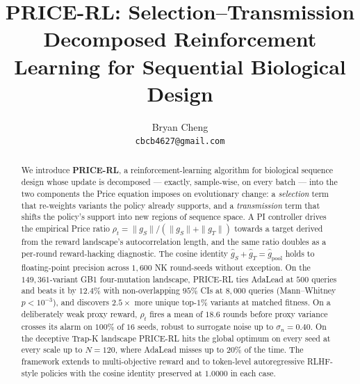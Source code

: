 \documentclass{article}
\title{PRICE-RL: Selection--Transmission Decomposed Reinforcement Learning for Sequential Biological Design}
\author{%
  Bryan Cheng \\
  \texttt{cbcb4627@gmail.com}
}
\begin{document}
\maketitle

\begin{abstract}
We introduce \textbf{PRICE-RL}, a reinforcement-learning algorithm for biological sequence design whose update is decomposed --- exactly, sample-wise, on every batch --- into the two components the Price equation imposes on evolutionary change: a \emph{selection} term that re-weights variants the policy already supports, and a \emph{transmission} term that shifts the policy's support into new regions of sequence space. A PI controller drives the empirical Price ratio $\rho_t = \|g_S\|/(\|g_S\|+\|g_T\|)$ towards a target derived from the reward landscape's autocorrelation length, and the same ratio doubles as a per-round reward-hacking diagnostic. The cosine identity $\hat g_S + \hat g_T = \hat g_{\mathrm{pool}}$ holds to floating-point precision across $1{,}600$ NK round-seeds without exception. On the $149{,}361$-variant GB1 four-mutation landscape, PRICE-RL ties AdaLead at $500$ queries and beats it by $12.4\%$ with non-overlapping $95\%$ CIs at $8{,}000$ queries (Mann--Whitney $p<10^{-3}$), and discovers $2.5\times$ more unique top-$1\%$ variants at matched fitness. On a deliberately weak proxy reward, $\rho_t$ fires a mean of $18.6$ rounds before proxy variance crosses its alarm on $100\%$ of $16$ seeds, robust to surrogate noise up to $\sigma_n = 0.40$. On the deceptive Trap-K landscape PRICE-RL hits the global optimum on every seed at every scale up to $N=120$, where AdaLead misses up to $20\%$ of the time. The framework extends to multi-objective reward and to token-level autoregressive RLHF-style policies with the cosine identity preserved at $1.0000$ in each case.
\end{abstract}












\appendix

\end{document}
